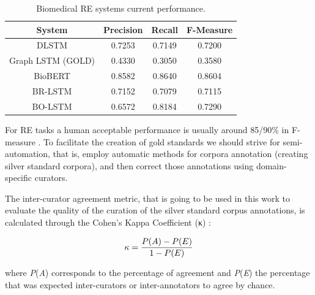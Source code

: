 \begin{table}[!ht]
\renewcommand\arraystretch{1.2}
\small
\captionsetup{font=small}
\caption[Biomedical RE Systems Performance]{Biomedical RE systems current performance.}
\centering
{}
\begin{tabular}{ |c|c|c|c| }
\hline
\textbf{System} & \textbf{Precision} & \textbf{Recall} & \textbf{F-Measure}\\
\hline\hline
DLSTM \citep{Wang2017} & 0.7253 & 0.7149 & 0.7200 \\
\hline
Graph LSTM (GOLD) \citep{song-etal-2018-n} & 0.4330 & 0.3050 & 0.3580 \\ 
\hline
BioBERT \citep{BIOBERT} & 0.8582 & 0.8640 & 0.8604 \\
\hline
BR-LSTM \citep{Xu2018LeveragingBR} & 0.7152 & 0.7079 & 0.7115 \\
\hline
BO-LSTM \citep{BOLSTM} & 0.6572 & 0.8184 & 0.7290 \\
\hline
\end{tabular}
\label{table:evaluation_soa}
\end{table}

For RE tasks a human acceptable performance is usually around 85/90\% in F-measure \citep{Aroyo2015TruthIA}. To facilitate the creation of gold standards we should strive for semi-automation, that is, employ automatic methods for corpora annotation (creating silver standard corpora), and then correct those annotations using domain-specific curators. 

The inter-curator agreement metric, that is going to be used in this work to evaluate the quality of the curation of the silver standard corpus annotations, is calculated through the Cohen's Kappa Coefficient (κ) \citep{doi:10.1177/001316446002000104}:

\begin{equation}
\small
\kappa = \frac{P(A) - P(E)}{1 - P(E)}
\label{equation:agreement}
\end{equation}

where \textit{P}(\textit{A}) corresponds to the percentage of agreement and \textit{P}(\textit{E}) the percentage that was expected inter-curators or inter-annotators to agree by chance.
